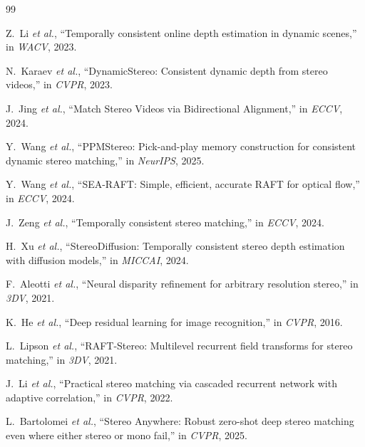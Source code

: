 \documentclass[letterpaper,10pt,conference]{ieeeconf}
\begin{document}


\balance
\begin{thebibliography}{99}
\scriptsize
\setlength{\itemsep}{0pt}\setlength{\parskip}{0pt}\setlength{\parsep}{0pt}

Z.~Li \emph{et al.}, ``Temporally consistent online depth estimation in
dynamic scenes,'' in \emph{WACV}, 2023.

N.~Karaev \emph{et al.}, ``DynamicStereo: Consistent dynamic depth from stereo
videos,'' in \emph{CVPR}, 2023.

J.~Jing \emph{et al.}, ``Match Stereo Videos via Bidirectional Alignment,'' in
\emph{ECCV}, 2024.

Y.~Wang \emph{et al.}, ``PPMStereo: Pick-and-play memory construction for
consistent dynamic stereo matching,'' in \emph{NeurIPS}, 2025.

Y.~Wang \emph{et al.}, ``SEA-RAFT: Simple, efficient, accurate RAFT for
optical flow,'' in \emph{ECCV}, 2024.

J.~Zeng \emph{et al.}, ``Temporally consistent stereo matching,'' in
\emph{ECCV}, 2024.

H.~Xu \emph{et al.}, ``StereoDiffusion: Temporally consistent stereo depth
estimation with diffusion models,'' in \emph{MICCAI}, 2024.

F.~Aleotti \emph{et al.}, ``Neural disparity refinement for arbitrary
resolution stereo,'' in \emph{3DV}, 2021.

K.~He \emph{et al.}, ``Deep residual learning for image recognition,'' in
\emph{CVPR}, 2016.

L.~Lipson \emph{et al.}, ``RAFT-Stereo: Multilevel recurrent field transforms
for stereo matching,'' in \emph{3DV}, 2021.

J.~Li \emph{et al.}, ``Practical stereo matching via cascaded recurrent
network with adaptive correlation,'' in \emph{CVPR}, 2022.

L.~Bartolomei \emph{et al.}, ``Stereo Anywhere: Robust zero-shot deep stereo
matching even where either stereo or mono fail,'' in \emph{CVPR}, 2025.


\end{thebibliography}
\end{document}

